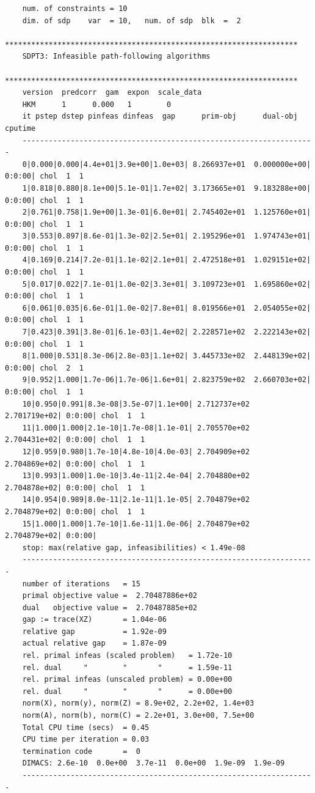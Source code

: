 \documentclass[letter]{article}
\begin{document}
\begin{Verbatim}
	num. of constraints = 10
	dim. of sdp    var  = 10,   num. of sdp  blk  =  2
	*******************************************************************
	SDPT3: Infeasible path-following algorithms
	*******************************************************************
	version  predcorr  gam  expon  scale_data
	HKM      1      0.000   1        0    
	it pstep dstep pinfeas dinfeas  gap      prim-obj      dual-obj    cputime
	-------------------------------------------------------------------
	0|0.000|0.000|4.4e+01|3.9e+00|1.0e+03| 8.266937e+01  0.000000e+00| 0:0:00| chol  1  1 
	1|0.818|0.880|8.1e+00|5.1e-01|1.7e+02| 3.173665e+01  9.183288e+00| 0:0:00| chol  1  1 
	2|0.761|0.758|1.9e+00|1.3e-01|6.0e+01| 2.745402e+01  1.125760e+01| 0:0:00| chol  1  1 
	3|0.553|0.897|8.6e-01|1.3e-02|2.5e+01| 2.195296e+01  1.974743e+01| 0:0:00| chol  1  1 
	4|0.169|0.214|7.2e-01|1.1e-02|2.1e+01| 2.472518e+01  1.029151e+02| 0:0:00| chol  1  1 
	5|0.017|0.022|7.1e-01|1.0e-02|3.3e+01| 3.109723e+01  1.695860e+02| 0:0:00| chol  1  1 
	6|0.061|0.035|6.6e-01|1.0e-02|7.8e+01| 8.019566e+01  2.054055e+02| 0:0:00| chol  1  1 
	7|0.423|0.391|3.8e-01|6.1e-03|1.4e+02| 2.228571e+02  2.222143e+02| 0:0:00| chol  1  1 
	8|1.000|0.531|8.3e-06|2.8e-03|1.1e+02| 3.445733e+02  2.448139e+02| 0:0:00| chol  2  1 
	9|0.952|1.000|1.7e-06|1.7e-06|1.6e+01| 2.823759e+02  2.660703e+02| 0:0:00| chol  1  1 
	10|0.950|0.991|8.3e-08|3.5e-07|1.1e+00| 2.712737e+02  2.701719e+02| 0:0:00| chol  1  1 
	11|1.000|1.000|2.1e-10|1.7e-08|1.1e-01| 2.705570e+02  2.704431e+02| 0:0:00| chol  1  1 
	12|0.959|0.980|1.7e-10|4.8e-10|4.0e-03| 2.704909e+02  2.704869e+02| 0:0:00| chol  1  1 
	13|0.993|1.000|1.0e-10|3.4e-11|2.4e-04| 2.704880e+02  2.704878e+02| 0:0:00| chol  1  1 
	14|0.954|0.989|8.0e-11|2.1e-11|1.1e-05| 2.704879e+02  2.704879e+02| 0:0:00| chol  1  1 
	15|1.000|1.000|1.7e-10|1.6e-11|1.0e-06| 2.704879e+02  2.704879e+02| 0:0:00|
	stop: max(relative gap, infeasibilities) < 1.49e-08
	-------------------------------------------------------------------
	number of iterations   = 15
	primal objective value =  2.70487886e+02
	dual   objective value =  2.70487885e+02
	gap := trace(XZ)       = 1.04e-06
	relative gap           = 1.92e-09
	actual relative gap    = 1.87e-09
	rel. primal infeas (scaled problem)   = 1.72e-10
	rel. dual     "        "       "      = 1.59e-11
	rel. primal infeas (unscaled problem) = 0.00e+00
	rel. dual     "        "       "      = 0.00e+00
	norm(X), norm(y), norm(Z) = 8.9e+02, 2.2e+02, 1.4e+03
	norm(A), norm(b), norm(C) = 2.2e+01, 3.0e+00, 7.5e+00
	Total CPU time (secs)  = 0.45  
	CPU time per iteration = 0.03  
	termination code       =  0
	DIMACS: 2.6e-10  0.0e+00  3.7e-11  0.0e+00  1.9e-09  1.9e-09
	-------------------------------------------------------------------
	

\end{Verbatim}
\end{document}
